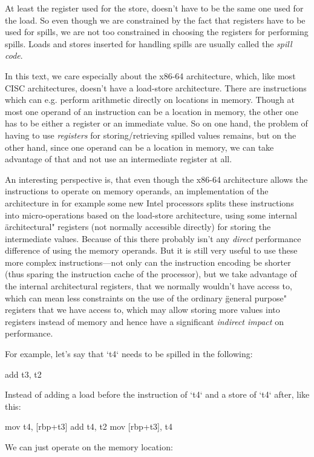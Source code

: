 At least the register used for the store, doesn't have to be the same one used
for the load. So even though we are constrained by the fact that registers have
to be used for spills, we are not too constrained in choosing the registers for
performing spills. Loads and stores inserted for handling spills are usually
called the {\em spill code}.

In this text, we care especially about the x86-64 architecture, which, like most
CISC architectures, doesn't have a load-store architecture. There are
instructions which can e.g. perform arithmetic directly on locations in memory.
Though at most one operand of an instruction can be a location in memory, the
other one has to be either a register or an immediate value. So on one hand, the
problem of having to use {\em registers} for storing/retrieving
spilled values remains, but on the other hand, since one operand can be a
location in memory, we can take advantage of that and not use an intermediate
register at all.

An interesting perspective is, that even though the x86-64 architecture allows
the instructions to operate on memory operands, an implementation of the
architecture in for example some new Intel processors splits these instructions
into micro-operations based on the load-store architecture, using some internal
\"architectural" registers (not normally accessible directly) for storing the
intermediate values. Because of this there probably isn't any {\em direct}
performance difference of using the memory operands. But it is still very useful
to use these more complex instructions---not only can the instruction encoding
be shorter (thus sparing the instruction cache of the processor), but we take
advantage of the internal architectural registers, that we normally wouldn't
have access to, which can mean less constraints on the use of the ordinary
\"general purpose" registers that we have access to, which may allow storing
more values into registers instead of memory and hence have a significant {\em
indirect impact} on performance.

For example, let's say that `t4` needs to be spilled in the following:

\begtt
add t3, t2
\endtt

Instead of adding a load before the instruction of `t4` and a store of `t4`
after, like this:

\begtt
mov t4, [rbp+t3]
add t4, t2
mov [rbp+t3], t4
\endtt

We can just operate on the memory location:

